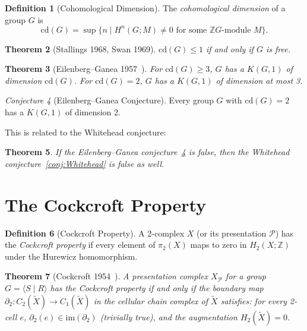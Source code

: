 \documentclass[12pt,a4paper]{amsart}
\newtheorem{theorem}{Theorem}[section]
\theoremstyle{definition}
\newtheorem{definition}[theorem]{Definition}
\theoremstyle{remark}
\newtheorem{conjecture}[theorem]{Conjecture}
\newcommand{\Z}{\mathbb{Z}}
\begin{document}
\begin{definition}[Cohomological Dimension]
The \emph{cohomological dimension} of a group $G$ is
\[
    \mathrm{cd}(G) = \sup\{ n \mid H^n(G; M) \neq 0 \text{ for some $\Z G$-module $M$} \}.
\]
\end{definition}

\begin{theorem}[Stallings 1968, Swan 1969]
$\mathrm{cd}(G) \leq 1$ if and only if $G$ is free.
\end{theorem}

\begin{theorem}[Eilenberg--Ganea 1957~\cite{EilenbergGanea1957}]
For $\mathrm{cd}(G) \geq 3$, $G$ has a $K(G,1)$ of dimension $\mathrm{cd}(G)$.
For $\mathrm{cd}(G) = 2$, $G$ has a $K(G,1)$ of dimension at most 3.
\end{theorem}

\begin{conjecture}[Eilenberg--Ganea Conjecture]
\label{conj:EG}
Every group $G$ with $\mathrm{cd}(G) = 2$ has a $K(G,1)$ of dimension 2.
\end{conjecture}

This is related to the Whitehead conjecture:

\begin{theorem}
If the Eilenberg--Ganea conjecture~\ref{conj:EG} is false, then the
Whitehead conjecture~\ref{conj:Whitehead} is false as well.
\end{theorem}

\section{The Cockcroft Property}

\begin{definition}[Cockcroft Property]
A 2-complex $X$ (or its presentation $\mathcal{P}$) has the
\emph{Cockcroft property} if every element of $\pi_2(X)$ maps to zero
in $H_2(X; \Z)$ under the Hurewicz homomorphism.
\end{definition}

\begin{theorem}[Cockcroft 1954~\cite{Cockcroft1954}]
A presentation complex $X_{\mathcal{P}}$ for a group $G = \langle S \mid R \rangle$
has the Cockcroft property if and only if the \emph{boundary map}
$\partial_2 \colon C_2(\widetilde{X}) \to C_1(\widetilde{X})$ in the
cellular chain complex of $\widetilde{X}$ satisfies:
for every 2-cell $e$, $\partial_2(e) \in \mathrm{im}(\partial_2)$
(trivially true), and the augmentation $H_2(\widetilde{X}) = 0$.
\end{theorem}
\end{document}
